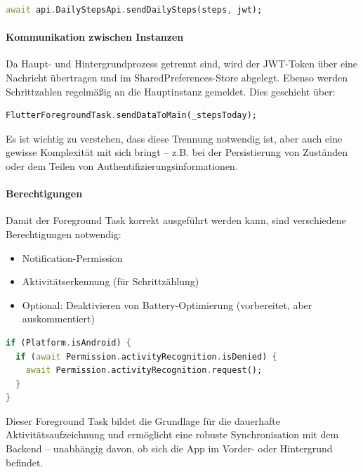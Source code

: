\documentclass[11pt,a4paper]{article}
\begin{document}
\begin{lstlisting}[language=Dart, caption=Synchronisierung mit dem Backend]
await api.DailyStepsApi.sendDailySteps(steps, jwt);
\end{lstlisting}

\paragraph{Kommunikation zwischen Instanzen}
Da Haupt- und Hintergrundprozess getrennt sind, wird der JWT-Token über eine Nachricht übertragen und im SharedPreferences-Store abgelegt. Ebenso werden Schrittzahlen regelmäßig an die Hauptinstanz gemeldet. Dies geschieht über:

\begin{lstlisting}[language=Dart, caption=Schritte an Hauptprozess senden]
FlutterForegroundTask.sendDataToMain(_stepsToday);
\end{lstlisting}

Es ist wichtig zu verstehen, dass diese Trennung notwendig ist, aber auch eine gewisse Komplexität mit sich bringt – z.B. bei der Persistierung von Zuständen oder dem Teilen von Authentifizierungsinformationen.

\paragraph{Berechtigungen}
Damit der Foreground Task korrekt ausgeführt werden kann, sind verschiedene Berechtigungen notwendig:

\begin{itemize}
    \item Notification-Permission
    \item Aktivitätserkennung (für Schrittzählung)
    \item Optional: Deaktivieren von Battery-Optimierung (vorbereitet, aber auskommentiert)
\end{itemize}

\begin{lstlisting}[language=Dart, caption=Abfrage der Berechtigungen]
if (Platform.isAndroid) {
  if (await Permission.activityRecognition.isDenied) {
    await Permission.activityRecognition.request();
  }
}
\end{lstlisting}

Dieser Foreground Task bildet die Grundlage für die dauerhafte Aktivitätsaufzeichnung und ermöglicht eine robuste Synchronisation mit dem Backend – unabhängig davon, ob sich die App im Vorder- oder Hintergrund befindet.
\end{document}
